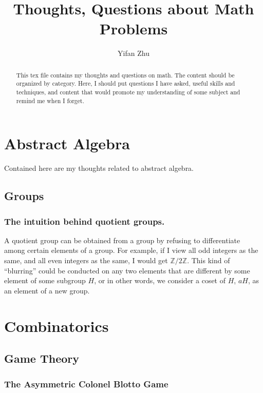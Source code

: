 \documentclass[12pt,oneside,reqno]{amsart}
\theoremstyle{definition}
\theoremstyle{remark}
\begin{document}
\title{Thoughts, Questions about Math Problems}
\author{Yifan Zhu}
\address{Yifan Zhu: Shanghai Foreign Language School, Shanghai 200083, China}
\maketitle

\begin{abstract}
  This tex file contains my thoughts and questions on math. The content should be organized by category.
  Here, I should put questions I have asked, useful skills and techniques, and content that would promote my understanding of some subject and remind me when I forget. 
\end{abstract}

\section{Abstract Algebra}
\label{sec:aa}
Contained here are my thoughts related to abstract algebra.

\subsection{Groups}
\subsubsection{The intuition behind quotient groups.}

A quotient group can be obtained from a group by refusing to differentiate among certain elements of a group. For example, if I view all odd integers as the same, and all even integers as the same, I would get $\mathbb{Z}/2\mathbb{Z}$.
This kind of ``blurring'' could be conducted on any two elements that are different by some element of some subgroup $H$, or in other words, we consider a coset of $H$, $aH$, as an element of a new group.

\section{Combinatorics}
\subsection{Game Theory}
\label{sec:gt}
\subsubsection{The Asymmetric Colonel Blotto Game}
\end{document}
